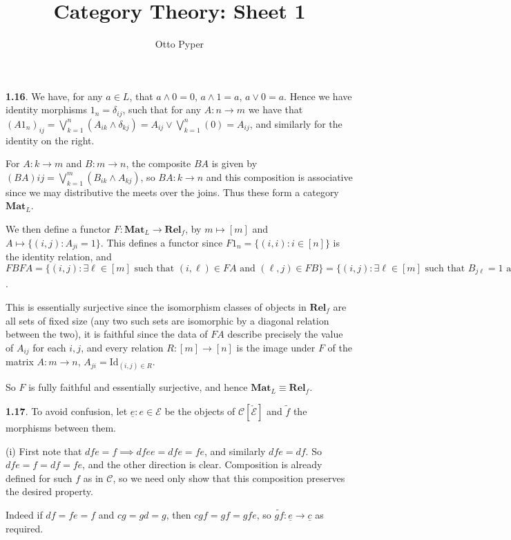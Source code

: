 \documentclass[]{article}
\title{Category Theory: Sheet 1}
\author{Otto Pyper}
\date{}
\theoremstyle{custhm}
\theoremstyle{cusdef}
\theoremstyle{custhm}
\theoremstyle{custhm}
\theoremstyle{custhm}
\theoremstyle{custhm}
\theoremstyle{cusdef}
\theoremstyle{remark}
\newcommand{\ra}{\rightarrow}
\begin{document}
\maketitle
\clearpage

\textbf{1.16}. We have, for any $a\in L$, that $a \land 0 = 0$, $a\land 1 = a$, $a\lor 0 = a$. Hence we have identity morphisms $1_{n} = \delta_{ij}$, such that for any $A:n\ra m$ we have that $(A1_{n})_{ij} = \bigvee_{k=1}^{n}(A_{ik}\land \delta_{kj}) = A_{ij}\lor \bigvee_{k=1}^{n}(0) = A_{ij}$, and similarly for the identity on the right.

For $A:k\ra m$ and $B:m\ra n$, the composite $BA$ is given by $(BA){ij} = \bigvee_{k=1}^{m}(B_{ik}\land A_{kj})$, so $BA : k\ra n$ and this composition is associative since we may distributive the meets over the joins. Thus these form a category $\textbf{Mat}_L$.

We then define a functor $F:\textbf{Mat}_L\ra \textbf{Rel}_f$, by $m\mapsto [m]$ and $A\mapsto \{(i,j):A_{ji} = 1\}$. This defines a functor since $F1_n = \{(i,i):i\in[n]\}$ is the identity relation, and $FBFA = \{(i,j):\exists \ell\in[m]\textrm{ such that }(i,\ell)\in FA\textrm{ and }(\ell,j)\in FB \} = \{(i,j):\exists \ell \in [m]\textrm{ such that }B_{j\ell} =1\textrm{ and }A_{\ell i} = 1\} = \{(i,j):(BA)_{ji} = 1\} = FBA$.

This is essentially surjective since the isomorphism classes of objects in $\textbf{Rel}_f$ are all sets of fixed size (any two such sets are isomorphic by a diagonal relation between the two), it is faithful since the data of $FA$ describe precisely the value of $A_{ij}$ for each $i,j$, and every relation $R:[m]\ra[n]$ is the image under $F$ of the matrix $A:m\ra n$, $A_{ji} = \textrm{Id}_{(i,j)\in R}$.

So $F$ is fully faithful and essentially surjective, and hence $\textbf{Mat}_L\equiv \textbf{Rel}_f$.

\textbf{1.17}. To avoid confusion, let $\underline{e}:e\in \mathcal{E}$ be the objects of $\mathcal{C}[\check{\mathcal{E}}]$ and $\tilde{f}$ the morphisms between them.

(i) First note that $dfe = f\implies dfee = dfe = fe$, and similarly $dfe = df $. So $dfe = f = df = fe$, and the other direction is clear. Composition is already defined for such $f$ as in $\mathcal{C}$, so we need only show that this composition preserves the desired property.

Indeed if $df = fe = f$ and $cg = gd = g$, then $cgf = gf = gfe$, so $\tilde{gf} : \underline{e}\ra\underline{c}$ as required.
\end{document}
